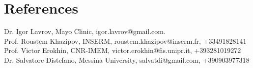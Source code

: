 \documentclass{moderncv}
\begin{document}

\section{References}

Dr. Igor Lavrov, Mayo Clinic, igor.lavrov@gmail.com.\\
Prof. Roustem Khazipov, INSERM, roustem.khazipov@inserm.fr, +33491828141\\
Prof. Victor Erokhin, CNR-IMEM, victor.erokhin@fis.unipr.it, +393281019272\\
Dr. Salvatore Distefano, Messina University, salvatdi@gmail.com, +390903977318
\end{document}
